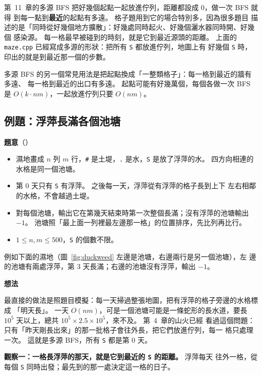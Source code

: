 第~11~章的多源 BFS 把好幾個起點一起放進佇列，距離都設成 $0$，做一次 BFS 就得
到每一點到\textbf{最近}的起點有多遠。 格子題用到它的場合特別多，因為很多題目
描述的是「同時從好幾個地方擴散」：好幾處同時起火、好幾個灑水器同時開、好幾個
感染源。 每一格最早被碰到的時刻，就是它到最近源頭的距離。 上面的
\texttt{maze.cpp} 已經寫成多源的形狀：把所有 \texttt{S} 都放進佇列，地圖上有
好幾個 \texttt{S} 時，印出的就是到最近那一個的步數。

多源 BFS 的另一個常見用法是把起點換成「一整類格子」：每一格到最近的牆有多遠、
每一格到最近的出口有多遠。 起點可能有好幾萬個，每個各做一次 BFS 是
$O(k \cdot nm)$，一起放進佇列只要 $O(nm)$。

\subsection{例題：浮萍長滿各個池塘}
\label{sec:ex-duckweed}

\textbf{題意}（）

\begin{itemize}
\item 濕地畫成 $n$ 列 $m$ 行，\texttt{\#} 是土堤，\texttt{.} 是水，\texttt{S}
是放了浮萍的水。 四方向相連的水格是同一個池塘。
\item 第 $0$ 天只有 \texttt{S} 有浮萍。 之後每一天，浮萍從有浮萍的格子長到上下
左右相鄰的水格，不會越過土堤。
\item 對每個池塘，輸出它在第幾天結束時第一次整個長滿；沒有浮萍的池塘輸出
$-1$。 池塘照「最上面一列裡最左邊那一格」的位置排序，先比列再比行。
\item $1 \le n, m \le 500$，\texttt{S} 的個數不限。
\end{itemize}

例如下面的濕地（圖~\ref{fig:duckweed} 左邊是池塘，右邊兩行是另一個池塘），左
邊的池塘有兩處浮萍，第 $3$ 天長滿；右邊的池塘沒有浮萍，輸出 $-1$。

\textbf{想法}

最直接的做法是照題目模擬：每一天掃過整張地圖，把有浮萍的格子旁邊的水格標成
「明天長」。 一天 $O(nm)$，可是一個池塘可能是一條蛇形的長水道，要長
$10^5$ 天以上，總共 $10^5 \times 2.5 \times 10^5$，來不及。 第~4~章的山火已經
看過這個問題：只有「昨天剛長出來」的那一批格子會往外長，把它們放進佇列，每一
格只處理一次。 這就是多源 BFS，所有 \texttt{S} 都是第 $0$ 天。

\textbf{觀察一：一格長浮萍的那天，就是它到最近的 \texttt{S} 的距離。} 浮萍每天
往外一格，從每個 \texttt{S} 同時出發；最先到的那一處決定這一格的日子。


